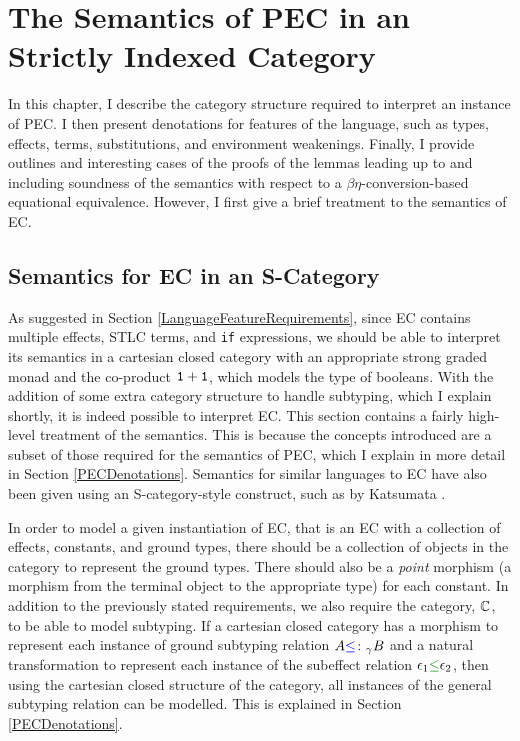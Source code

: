 
\chapter{The Semantics of PEC in an Strictly Indexed Category}
In this chapter, I  describe the category structure required to interpret an instance of PEC\@. I then present denotations for features of the language, such as types, effects, terms, substitutions, and environment weakenings. Finally, I provide outlines and interesting cases of the proofs of the lemmas leading up to and including soundness of the semantics with respect to a $\beta\eta$-conversion-based equational equivalence. However, I first give a brief treatment to the semantics of EC.


\section{Semantics for EC in an S-Category}\label{SCategoryIntro}

As suggested in Section \ref{LanguageFeatureRequirements}, since EC contains multiple effects, STLC terms, and \texttt{if} expressions, we should be able to interpret its semantics in a cartesian closed category with an appropriate strong graded monad and the co-product $\texttt{1} + \texttt{1}$, which models the type of booleans. With the addition of some extra category structure to handle subtyping, which I explain shortly, it is indeed possible to interpret EC. This section contains a fairly high-level treatment of the semantics. This is because the concepts introduced are a subset of those required for the semantics of PEC, which I explain in more detail in Section \ref{PECDenotations}. Semantics for similar languages to EC have also been given using an S-category-style construct, such as by Katsumata \cite{Katsumata:2014}. 

In order to model a given instantiation of EC, that is an EC with a collection of effects, constants, and ground types, there should be a collection of objects in the category to represent the ground types. There should also be a \textit{point} morphism (a morphism from the terminal object to the appropriate type) for each constant. In addition to the previously stated requirements, we also require the category, $\mathbb{C}$, to be able to model subtyping. If a cartesian closed category has a morphism to represent each instance of  ground subtyping relation $A{\color{blue} \leq\colon}_\gamma B$ and a natural transformation to represent each instance of the subeffect relation $\e_1\subeffect \e_2$, then using the cartesian closed structure of the category, all instances of the general subtyping relation can be modelled. This is explained in Section \ref{PECDenotations}.

